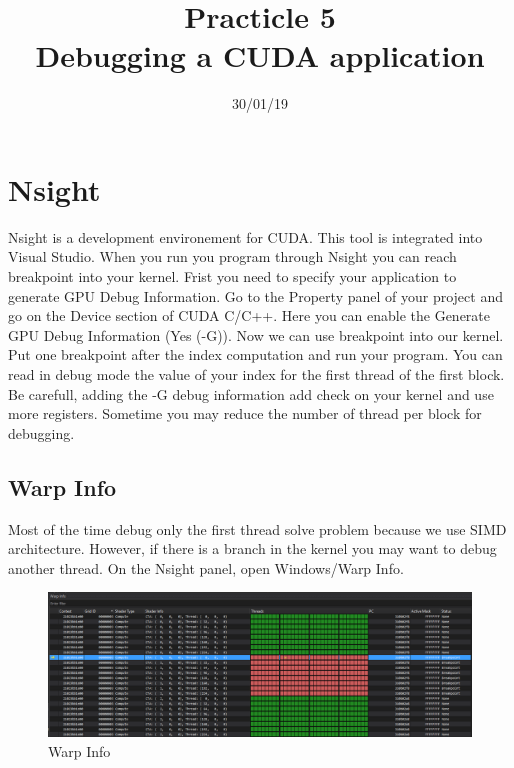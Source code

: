 \documentclass{article}
\begin{document}
\title{Practicle 5\\Debugging a CUDA application}
\date{30/01/19}
\maketitle

\begin{abstract}
	
\end{abstract}

\section{Nsight}
Nsight is a development environement for CUDA. This tool is integrated into Visual Studio. When you run you program through Nsight you can reach breakpoint into your kernel. Frist you need to specify your application to generate GPU Debug Information. Go to the Property panel of your project and go on the Device section of CUDA C/C++. Here you can enable the Generate GPU Debug Information (Yes (-G)). Now we can use breakpoint into our kernel. Put one breakpoint after the index computation and run your program. You can read in debug mode the value of your index for the first thread of the first block. Be carefull, adding the -G debug information add check on your kernel and use more registers. Sometime you may reduce the number of thread per block for debugging. 
\subsection{Warp Info}
Most of the time debug only the first thread solve problem because we use SIMD architecture. However, if there is a branch in the kernel you may want to debug another thread. On the Nsight panel, open Windows/Warp Info.

\begin{figure}[h]
	\centering
	\includegraphics[scale=0.47]{figures/warpinfo.png}
	\caption{Warp Info}
\end{figure}
\end{document}

